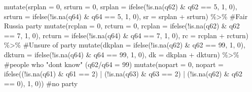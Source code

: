 \documentclass[
  letterpaper,
  DIV=11,
  numbers=noendperiod]{scrartcl}
\newenvironment{Shaded}{\begin{snugshade}}{\end{snugshade}}
\newcommand{\AttributeTok}[1]{\textcolor[rgb]{0.40,0.45,0.13}{#1}}
\newcommand{\CommentTok}[1]{\textcolor[rgb]{0.37,0.37,0.37}{#1}}
\newcommand{\DecValTok}[1]{\textcolor[rgb]{0.68,0.00,0.00}{#1}}
\newcommand{\FunctionTok}[1]{\textcolor[rgb]{0.28,0.35,0.67}{#1}}
\newcommand{\NormalTok}[1]{\textcolor[rgb]{0.00,0.23,0.31}{#1}}
\newcommand{\SpecialCharTok}[1]{\textcolor[rgb]{0.37,0.37,0.37}{#1}}
\begin{document}
\begin{Shaded}
\begin{Highlighting}[]
  \FunctionTok{mutate}\NormalTok{(}\AttributeTok{srplan =} \DecValTok{0}\NormalTok{, }\AttributeTok{srturn =} \DecValTok{0}\NormalTok{,}
         \AttributeTok{srplan =} \FunctionTok{ifelse}\NormalTok{(}\SpecialCharTok{!}\FunctionTok{is.na}\NormalTok{(q62) }\SpecialCharTok{\&}\NormalTok{ q62 }\SpecialCharTok{==} \DecValTok{5}\NormalTok{, }\DecValTok{1}\NormalTok{, }\DecValTok{0}\NormalTok{),}
         \AttributeTok{srturn =} \FunctionTok{ifelse}\NormalTok{(}\SpecialCharTok{!}\FunctionTok{is.na}\NormalTok{(q64) }\SpecialCharTok{\&}\NormalTok{ q64 }\SpecialCharTok{==} \DecValTok{5}\NormalTok{, }\DecValTok{1}\NormalTok{, }\DecValTok{0}\NormalTok{),}
         \AttributeTok{sr =}\NormalTok{ srplan }\SpecialCharTok{+}\NormalTok{ srturn) }\SpecialCharTok{\%\textgreater{}\%} \CommentTok{\#Fair Russia party}
  \FunctionTok{mutate}\NormalTok{(}\AttributeTok{rcplan =} \DecValTok{0}\NormalTok{, }\AttributeTok{rcturn =} \DecValTok{0}\NormalTok{,}
         \AttributeTok{rcplan =} \FunctionTok{ifelse}\NormalTok{(}\SpecialCharTok{!}\FunctionTok{is.na}\NormalTok{(q62) }\SpecialCharTok{\&}\NormalTok{ q62 }\SpecialCharTok{==} \DecValTok{7}\NormalTok{, }\DecValTok{1}\NormalTok{, }\DecValTok{0}\NormalTok{),}
         \AttributeTok{rcturn =} \FunctionTok{ifelse}\NormalTok{(}\SpecialCharTok{!}\FunctionTok{is.na}\NormalTok{(q64) }\SpecialCharTok{\&}\NormalTok{ q64 }\SpecialCharTok{==} \DecValTok{7}\NormalTok{, }\DecValTok{1}\NormalTok{, }\DecValTok{0}\NormalTok{),}
         \AttributeTok{rc =}\NormalTok{ rcplan }\SpecialCharTok{+}\NormalTok{ rcturn) }\SpecialCharTok{\%\textgreater{}\%} \CommentTok{\#Unsure of party}
  \FunctionTok{mutate}\NormalTok{(}\AttributeTok{dkplan =} \FunctionTok{ifelse}\NormalTok{(}\SpecialCharTok{!}\FunctionTok{is.na}\NormalTok{(q62) }\SpecialCharTok{\&}\NormalTok{ q62 }\SpecialCharTok{==} \DecValTok{99}\NormalTok{, }\DecValTok{1}\NormalTok{, }\DecValTok{0}\NormalTok{),}
         \AttributeTok{dkturn =} \FunctionTok{ifelse}\NormalTok{(}\SpecialCharTok{!}\FunctionTok{is.na}\NormalTok{(q64) }\SpecialCharTok{\&}\NormalTok{ q64 }\SpecialCharTok{==} \DecValTok{99}\NormalTok{, }\DecValTok{1}\NormalTok{, }\DecValTok{0}\NormalTok{),}
         \AttributeTok{dk =}\NormalTok{ dkplan }\SpecialCharTok{+}\NormalTok{ dkturn) }\SpecialCharTok{\%\textgreater{}\%} \CommentTok{\#people who "don\textquotesingle{}t know" (q62/q64 = 99)}
  \FunctionTok{mutate}\NormalTok{(}\AttributeTok{nopart =} \DecValTok{0}\NormalTok{,}
         \AttributeTok{nopart =} \FunctionTok{ifelse}\NormalTok{((}\SpecialCharTok{!}\FunctionTok{is.na}\NormalTok{(q61) }\SpecialCharTok{\&}\NormalTok{ q61 }\SpecialCharTok{==} \DecValTok{2}\NormalTok{) }\SpecialCharTok{|}\NormalTok{ (}\SpecialCharTok{!}\FunctionTok{is.na}\NormalTok{(q63) }\SpecialCharTok{\&}\NormalTok{ q63 }\SpecialCharTok{==} \DecValTok{2}\NormalTok{) }\SpecialCharTok{|} 
\NormalTok{                           (}\SpecialCharTok{!}\FunctionTok{is.na}\NormalTok{(q62) }\SpecialCharTok{\&}\NormalTok{ q62 }\SpecialCharTok{==} \DecValTok{0}\NormalTok{), }\DecValTok{1}\NormalTok{, }\DecValTok{0}\NormalTok{)) }\CommentTok{\#no party}


\end{Highlighting}
\end{Shaded}
\end{document}
